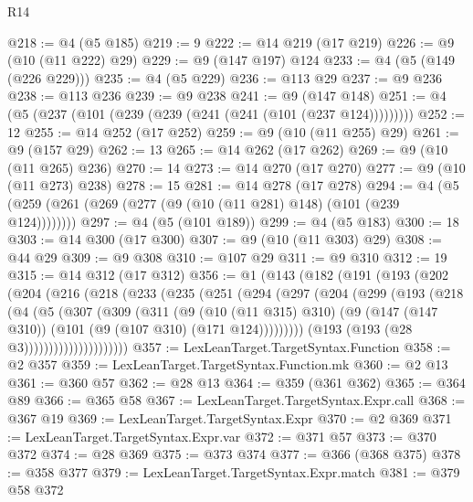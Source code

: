 \begin{lexlean}{R14}
\begin{coremodule}
@218 := @4 (@5 @185)
@219 := 9
@222 := @14 @219 (@17 @219)
@226 := @9 (@10 (@11 @222) @29)
@229 := @9 (@147 @197) @124
@233 := @4 (@5 (@149 (@226 @229)))
@235 := @4 (@5 @229)
@236 := @113 @29
@237 := @9 @236
@238 := @113 @236
@239 := @9 @238
@241 := @9 (@147 @148)
@251 := @4 (@5 (@237 (@101 (@239 (@239 (@241 (@241 (@101 (@237 @124)))))))))
@252 := 12
@255 := @14 @252 (@17 @252)
@259 := @9 (@10 (@11 @255) @29)
@261 := @9 (@157 @29)
@262 := 13
@265 := @14 @262 (@17 @262)
@269 := @9 (@10 (@11 @265) @236)
@270 := 14
@273 := @14 @270 (@17 @270)
@277 := @9 (@10 (@11 @273) @238)
@278 := 15
@281 := @14 @278 (@17 @278)
@294 := @4 (@5 (@259 (@261 (@269 (@277 (@9 (@10 (@11 @281) @148) (@101 (@239 @124))))))))
@297 := @4 (@5 (@101 @189))
@299 := @4 (@5 @183)
@300 := 18
@303 := @14 @300 (@17 @300)
@307 := @9 (@10 (@11 @303) @29)
@308 := @44 @29
@309 := @9 @308
@310 := @107 @29
@311 := @9 @310
@312 := 19
@315 := @14 @312 (@17 @312)
@356 := @1
    (@143
      (@182
        (@191
          (@193
            (@202
              (@204
                (@216
                  (@218
                    (@233
                      (@235
                        (@251
                          (@294
                            (@297
                              (@204
                                (@299
                                  (@193
                                    (@218
                                      (@4
                                        (@5
                                          (@307
                                            (@309
                                              (@311
                                                (@9
                                                  (@10 (@11 @315) @310)
                                                  (@9
                                                    (@147 (@147 @310))
                                                    (@101 (@9 (@107 @310) (@171 @124)))))))))
                                        (@193 (@193 (@28 @3)))))))))))))))))))))
@357 := LexLeanTarget.TargetSyntax.Function
@358 := @2 @357
@359 := LexLeanTarget.TargetSyntax.Function.mk
@360 := @2 @13
@361 := @360 @57
@362 := @28 @13
@364 := @359 (@361 @362)
@365 := @364 @89
@366 := @365 @58
@367 := LexLeanTarget.TargetSyntax.Expr.call
@368 := @367 @19
@369 := LexLeanTarget.TargetSyntax.Expr
@370 := @2 @369
@371 := LexLeanTarget.TargetSyntax.Expr.var
@372 := @371 @57
@373 := @370 @372
@374 := @28 @369
@375 := @373 @374
@377 := @366 (@368 @375)
@378 := @358 @377
@379 := LexLeanTarget.TargetSyntax.Expr.match
@381 := @379 @58 @372

\end{coremodule}
\end{lexlean}
